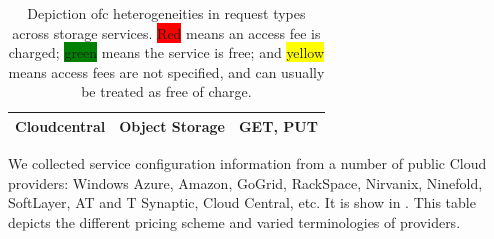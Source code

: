 \begin{table}[htbp]
{\begin{tabular}{|l|l|l|l|l|}
\textbf{Cloudcentral}          & Object Storage               & \multicolumn{3}{l|}{\cellcolor[HTML]{9AFF99}GET, PUT}                                                                            \\ \hline
\end{tabular}
}
\caption{
    Depiction ofc heterogeneities in request types across storage services.
    \colorbox{red}{Red} means an access fee is charged;
    \colorbox{green}{green} means the service is free;
    and \colorbox{yellow}{yellow} means access fees are not specified,
    and can usually be treated as free of charge.
}
\label{table:request_types_across_storage_services}
\end{table}

We collected service configuration information from a number of public Cloud providers: Windows Azure, Amazon, GoGrid, RackSpace, Nirvanix, Ninefold, SoftLayer, AT and T Synaptic, Cloud Central, etc. It is show in . This table depicts the different pricing scheme and varied terminologies of providers.


